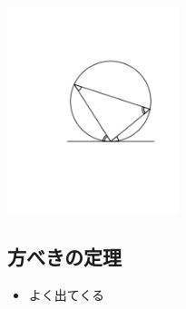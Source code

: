\documentclass[uplatex,fleqn]{jsbook}
\begin{document}
\includegraphics[clip,width=5cm]{figures/setsugen.pdf}

\subsection{方べきの定理}
\begin{itemize}
    \item よく出てくる
\end{itemize}
\end{document}
